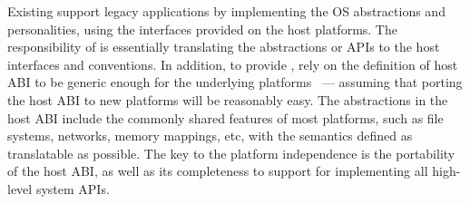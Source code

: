 Existing \liboses{} support legacy applications
by implementing the OS abstractions and personalities,
using the interfaces provided on the host platforms.
The responsibility of \liboses{} %
is essentially translating the abstractions or APIs to the host interfaces and conventions.
In addition,
to provide ,
\liboses{} rely on the definition of host ABI to be
generic enough for the underlying platforms~\citep{porter11drawbridge, baumann13bascule, baumann14haven, tsai14graphene}
--- assuming that porting the host ABI to new platforms
will be reasonably easy.
The abstractions in the host ABI
include the commonly shared features of most platforms,
such as file systems, networks, memory mappings, etc,
with the semantics defined as translatable as possible.
The key to the platform independence is the portability of the host ABI,
as well as its completeness to support \liboses{} for implementing all high-level system APIs.





